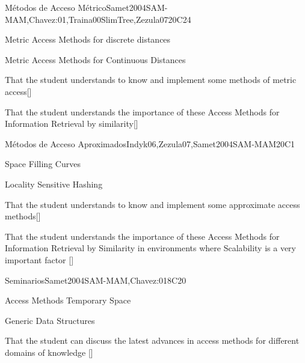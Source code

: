 \begin{syllabus}
\begin{unit}{Métodos de Acceso Métrico}{}{Samet2004SAM-MAM,Chavez:01,Traina00SlimTree,Zezula07}{20}{C24}
   \begin{topics}
         \item Metric Access Methods for discrete distances
         \item Metric Access Methods for Continuous Distances
   \end{topics}
   \begin{learningoutcomes}
         \item That the student understands to know and implement some methods of metric access[\Usage]
         \item That the student understands the importance of these Access Methods for Information Retrieval by similarity[\Usage]
   \end{learningoutcomes}
\end{unit}

\begin{unit}{Métodos de Acceso Aproximados}{}{Indyk06,Zezula07,Samet2004SAM-MAM}{20}{C1}
   \begin{topics}
         \item Space Filling Curves
         \item Locality Sensitive Hashing
   \end{topics}
   \begin{learningoutcomes}
         \item That the student understands to know and implement some approximate access methods[\Usage]
         \item That the student understands the importance of these Access Methods for Information Retrieval by Similarity in environments where Scalability is a very important factor [\Usage]
   \end{learningoutcomes}
\end{unit}

\begin{unit}{Seminarios}{}{Samet2004SAM-MAM,Chavez:01}{8}{C20}
	\begin{topics}
         \item Access Methods Temporary Space
         \item Generic Data Structures
   \end{topics}
   \begin{learningoutcomes}
         \item That the student can discuss the latest advances in access methods for different domains of knowledge [\Usage]
   \end{learningoutcomes}
\end{unit}

\begin{coursebibliography}
\end{coursebibliography}

\end{syllabus}
